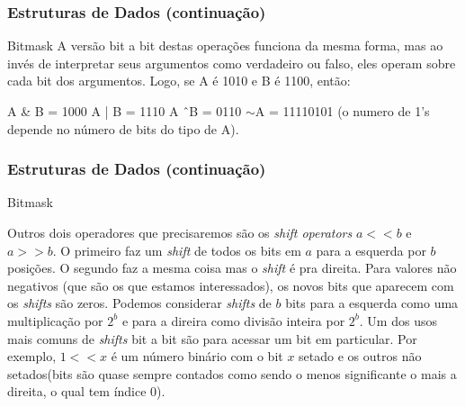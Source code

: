 \begin{frame}
\frametitle{Estruturas de Dados (continuação)}
\begin{block}{Bitmask}
A versão bit a bit destas operações funciona da mesma forma, mas ao invés de interpretar seus argumentos como verdadeiro ou falso, eles operam sobre cada bit dos argumentos. Logo, se A é 1010 e B é 1100, então:
\begin{itemize}
	\bitem A \& B = 1000
	\bitem A | B = 1110
	\bitem A \^\ B = 0110
	\bitem $\sim$A = 11110101 (o numero de 1's depende no número de bits do tipo de A).
\end{itemize}
\end{block}
\end{frame}

\begin{frame}
\frametitle{Estruturas de Dados (continuação)}
\begin{block}{Bitmask}
\begin{itemize}
	\bitem Outros dois operadores que precisaremos são os \textit{shift operators} $a << b$ e $a >> b$. O primeiro faz um \textit{shift} de todos os bits em $a$ para a esquerda por $b$ posições. O segundo faz a mesma coisa mas o \textit{shift} é pra direita.
	\bitem Para valores não negativos (que são os que estamos interessados), os novos bits que aparecem com os \textit{shifts} são zeros.
	\bitem Podemos considerar \textit{shifts} de $b$ bits para a esquerda como uma multiplicação por $2^b$ e para a direira como divisão inteira por $2^b$.
	\bitem Um dos usos mais comuns de \textit{shifts} bit a bit são para acessar um bit em particular. Por exemplo, $1 << x$ é um número binário com o bit $x$ setado e os outros não setados(bits são quase sempre contados como sendo o menos significante o mais a direita, o qual tem índice 0).
\end{itemize}
\end{block}
\end{frame}

